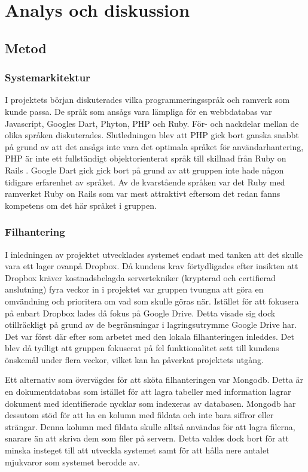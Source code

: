 \chapter{Analys och diskussion}

\section{Metod}

\subsection{Systemarkitektur}

I projektets början diskuterades vilka programmeringsspråk och ramverk som kunde passa. De språk som ansågs vara lämpliga för en webbdatabas var Javascript, Googles Dart, Phyton, PHP och Ruby. För- och nackdelar mellan de olika språken diskuterades. Slutledningen blev att PHP gick bort ganska snabbt på grund av att det ansågs inte vara det optimala språket för användarhantering, PHP är inte ett fullständigt objektorienterat språk till skillnad från Ruby on Rails \cite{shiftdynamic}. Google Dart gick gick bort på grund av att gruppen inte hade någon tidigare erfarenhet av språket. Av de kvarstående språken var det Ruby med ramverket Ruby on Rails som var mest attraktivt eftersom det redan fanns kompetens om det här språket i gruppen.

\subsection{Filhantering}

I inledningen av projektet utvecklades systemet endast med tanken att det skulle vara ett lager ovanpå Dropbox. Då kundens krav förtydligades efter insikten att Dropbox kräver kostnadsbelagda servertekniker (krypterad och certifierad anslutning) fyra veckor in i projektet var gruppen tvungna att göra en omvändning och prioritera om vad som skulle göras när. Istället för att fokusera på enbart Dropbox lades då fokus på Google Drive. Detta visade sig dock otillräckligt på grund av de begränsningar i lagringsutrymme Google Drive har. Det var först där efter som arbetet med den lokala filhanteringen inleddes. Det blev då tydligt att gruppen fokuserat på fel funktionalitet sett till kundens önskemål under flera veckor, vilket kan ha påverkat projektets utgång.

Ett alternativ som övervägdes för att sköta filhanteringen var Mongodb. Detta är en dokumentdatabas som istället för att lagra tabeller med information lagrar dokument med identifierade nycklar som indexeras av databasen. Mongodb har dessutom stöd för att ha en kolumn med fildata och inte bara siffror eller strängar. Denna kolumn med fildata skulle alltså användas för att lagra filerna, snarare än att skriva dem som filer på servern. Detta valdes dock bort för att minska insteget till att utveckla systemet samt för att hålla nere antalet mjukvaror som systemet berodde av.

